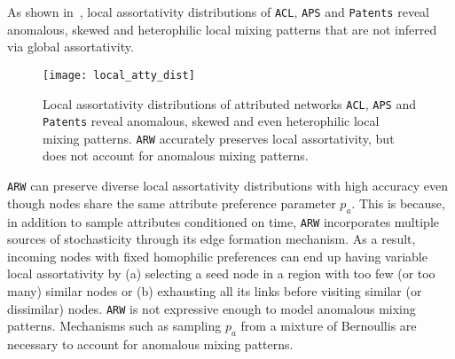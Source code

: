 As shown in~, local assortativity distributions
of \texttt{ACL}, \texttt{APS} and \texttt{Patents} reveal anomalous, skewed
and heterophilic local mixing patterns that are not inferred via global assortativity.

\begin{figure}[h]
	\centering
	\vspace{-9pt}
	\texttt{[image: local\_atty\_dist]}
	\caption{Local assortativity distributions of attributed networks \texttt{ACL}, \texttt{APS}
		and \texttt{Patents} reveal anomalous, skewed and even heterophilic local mixing patterns.
		\texttt{ARW} accurately preserves local assortativity, but does not account for anomalous mixing patterns.}
	\label{fig:local_atty}
	\vspace{-8pt}
\end{figure}

\texttt{ARW} can preserve
diverse local assortativity distributions with high accuracy even though nodes
share the same attribute preference parameter $p_a$. This is because, in addition
to sample attributes conditioned on time, \texttt{ARW}
incorporates multiple sources of stochasticity through its edge formation
mechanism. As a result, incoming nodes with fixed homophilic preferences can end
up having variable local assortativity by (a) selecting a seed node in a region
with too few (or too many) similar nodes or (b) exhausting all its links before
visiting similar (or dissimilar) nodes.
\texttt{ARW} is not expressive enough to model anomalous
mixing patterns. Mechanisms such as sampling $p_a$ from a mixture of
Bernoullis are necessary to account for anomalous mixing patterns.
